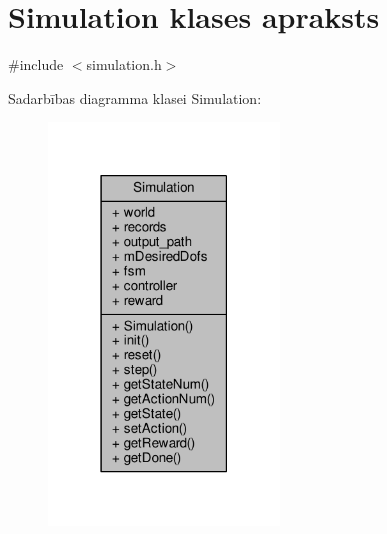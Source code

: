 \hypertarget{class_simulation}{}\section{Simulation klases apraksts}
\label{class_simulation}


{\ttfamily \#include $<$simulation.\+h$>$}



Sadarbības diagramma klasei Simulation\+:
\nopagebreak
\begin{figure}[H]
\begin{center}
\leavevmode
\includegraphics[width=174pt]{class_simulation__coll__graph}
\end{center}
\end{figure}

